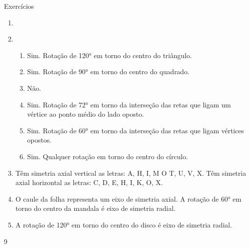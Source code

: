 \begin{answer}{Exercícios}
{\exerciselist
\begin{enumerate}
\item 
\begin{enumerate}
\end{enumerate}

\item
\begin{enumerate}
\item Sim. Rotação de 120° em torno do centro do triângulo.
\item Sim. Rotação de 90° em torno do centro do quadrado.
\item Não. 
\item Sim. Rotação de 72° em torno da interseção das retas que ligam um vértice ao ponto médio do lado oposto.
\item Sim. Rotação de 60° em torno da interseção das retas que ligam vértices opostos.
\item Sim. Qualquer rotação em torno do centro do círculo.
\end{enumerate}

\item Têm simetria axial vertical as letras: A, H, I, M O T, U, V, X. Têm simetria axial horizontal as letras: C, D, E, H, I, K, O, X.

\item O caule da folha representa um eixo de simetria axial. A rotação de 60° em torno do centro da mandala é eixo de simetria radial.

\item A rotação de 120° em torno do centro do disco é eixo de simetria radial.
\end{enumerate}

\clearpage

\phantom{a}
}{9}
\end{answer}
